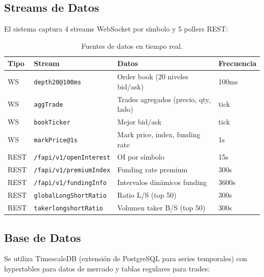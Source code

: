 \documentclass[11pt,a4paper]{article}
\newcommand{\code}[1]{\texttt{\small #1}}
\begin{document}
\subsection{Streams de Datos}

El sistema captura 4 streams WebSocket por s\'imbolo y 5 pollers REST:

\begin{table}[H]
\centering
\caption{Fuentes de datos en tiempo real.}
\label{tab:streams}
\begin{tabularx}{\textwidth}{llXl}
\toprule
\textbf{Tipo} & \textbf{Stream} & \textbf{Datos} & \textbf{Frecuencia} \\
\midrule
WS & \code{depth20@100ms} & Order book (20 niveles bid/ask) & 100ms \\
WS & \code{aggTrade} & Trades agregados (precio, qty, lado) & tick \\
WS & \code{bookTicker} & Mejor bid/ask & tick \\
WS & \code{markPrice@1s} & Mark price, index, funding rate & 1s \\
\midrule
REST & \code{/fapi/v1/openInterest} & OI por s\'imbolo & 15s \\
REST & \code{/fapi/v1/premiumIndex} & Funding rate premium & 300s \\
REST & \code{/fapi/v1/fundingInfo} & Intervalos din\'amicos funding & 3600s \\
REST & \code{globalLongShortRatio} & Ratio L/S (top 50) & 300s \\
REST & \code{takerlongshortRatio} & Volumen taker B/S (top 50) & 300s \\
\bottomrule
\end{tabularx}
\end{table}

\subsection{Base de Datos}

Se utiliza TimescaleDB (extensi\'on de PostgreSQL para series temporales)
con hypertables para datos de mercado y tablas regulares para trades:
\end{document}
